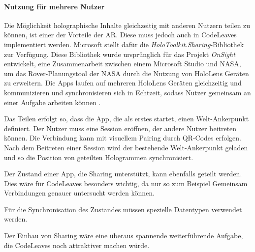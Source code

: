 \paragraph*{Nutzung für mehrere Nutzer}
Die Möglichkeit holographische Inhalte gleichzeitig mit anderen Nutzern teilen zu können, ist einer der Vorteile der AR. Diese muss jedoch auch in CodeLeaves implementiert werden. Microsoft stellt dafür die \textit{HoloToolkit.Sharing}-Bibliothek zur Verfügung. Diese Bibliothek wurde ursprünglich für das Projekt \textit{OnSight} entwickelt, eine Zusammenarbeit zwischen einem Microsoft Studio und NASA, um das Rover-Planungstool der NASA durch die Nutzung von HoloLens Geräten zu erweitern. Die Apps laufen auf mehreren HoloLens Geräten gleichzeitig und kommunizieren und synchronisieren sich in Echtzeit, sodass Nutzer gemeinsam an einer Aufgabe arbeiten können \cite{microsoft2017sharing}.

Das Teilen erfolgt so, dass die App, die als erstes startet, einen Welt-Ankerpunkt definiert. Der Nutzer muss eine Session eröffnen, der andere Nutzer beitreten können. Die Verbindung kann mit visuellem Pairing durch QR-Codes erfolgen. Nach dem Beitreten einer Session wird der bestehende Welt-Ankerpunkt geladen und so die Position von geteilten Hologrammen synchronisiert.

Der Zustand einer App, die Sharing unterstützt, kann ebenfalls geteilt werden. Dies wäre für CodeLeaves besonders wichtig, da nur so zum Beispiel Gemeinsam Verbindungen genauer untersucht werden können.

Für die Synchronisation des Zustandes müssen spezielle Datentypen verwendet werden.

Der Einbau von Sharing wäre eine überaus spannende weiterführende Aufgabe, die CodeLeaves noch attraktiver machen würde.\\


  
